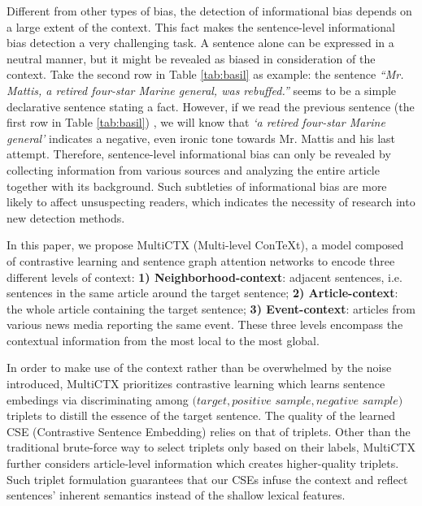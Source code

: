 \documentclass[letterpaper]{article} %
\begin{document}
Different from other types of bias, the detection of informational bias depends on a large extent of the context. This fact makes the sentence-level informational bias detection a very challenging task. A sentence alone can be expressed in a neutral manner, but it might be revealed as biased in consideration of the context. Take the second row in Table \ref{tab:basil} as example: the sentence \textit{``Mr. Mattis, a retired four-star Marine general, was rebuffed.''} \label{sent:mattis} seems to be a simple declarative sentence stating a fact. However, if we read the previous sentence (the first row in Table \ref{tab:basil}) , we will know that \textit{`a retired four-star Marine general'} indicates a negative, even ironic tone towards Mr. Mattis and his last attempt. Therefore, sentence-level informational bias can only be revealed by collecting information from various sources and analyzing the entire article together with its background. Such subtleties of informational bias are more likely to affect unsuspecting readers, which indicates the necessity of research into new detection methods. 

In this paper, we propose MultiCTX (Multi-level ConTeXt), a model composed of contrastive learning and sentence graph attention networks to encode three different levels of context:  \textbf{1) Neighborhood-context}: adjacent sentences, i.e. sentences in the same article around the target sentence; \textbf{2) Article-context}: the whole article containing the target sentence; \textbf{3) Event-context}: articles from various news media reporting the same event. These three levels encompass the contextual information from the most local to the most global.

In order to make use of the context rather than be overwhelmed by the noise introduced, MultiCTX prioritizes contrastive learning which learns sentence embedings via discriminating among $(target, positive$ $sample, negative$ $sample)$ triplets to distill the essence of the target sentence. The quality of the learned CSE (Contrastive Sentence Embedding) relies on that of triplets. Other than the traditional brute-force way to select triplets only based on their labels, MultiCTX further considers article-level information which creates higher-quality triplets. Such triplet formulation guarantees that our CSEs infuse the context and reflect sentences' inherent semantics instead of the shallow lexical features. 

\end{document}
